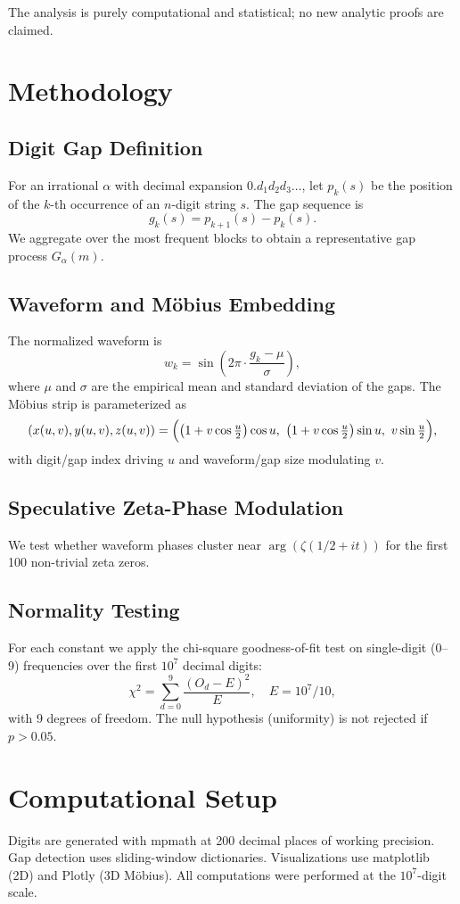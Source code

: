 \documentclass[11pt]{amsart}
\theoremstyle{plain}
\theoremstyle{definition}
\begin{document}
The analysis is purely computational and statistical; no new analytic proofs are claimed.

\section{Methodology}

\subsection{Digit Gap Definition}
For an irrational $\alpha$ with decimal expansion $0.d_1 d_2 d_3 \dots$, let $p_k(s)$ be the position of the $k$-th occurrence of an $n$-digit string $s$. The gap sequence is
\[
g_k(s) = p_{k+1}(s) - p_k(s).
\]
We aggregate over the most frequent blocks to obtain a representative gap process $G_\alpha(m)$.

\subsection{Waveform and Möbius Embedding}
The normalized waveform is
\[
w_k = \sin\left(2\pi \cdot \frac{g_k - \mu}{\sigma}\right),
\]
where $\mu$ and $\sigma$ are the empirical mean and standard deviation of the gaps. The Möbius strip is parameterized as
\[
(x(u,v), y(u,v), z(u,v)) = \Bigl( \bigl(1 + v \cos\tfrac{u}{2}\bigr)\cos u,\ 
\bigl(1 + v \cos\tfrac{u}{2}\bigr)\sin u,\ v \sin\tfrac{u}{2} \Bigr),
\]
with digit/gap index driving $u$ and waveform/gap size modulating $v$.

\subsection{Speculative Zeta-Phase Modulation}
We test whether waveform phases cluster near $\arg(\zeta(1/2 + it))$ for the first 100 non-trivial zeta zeros.

\subsection{Normality Testing}
For each constant we apply the chi-square goodness-of-fit test on single-digit (0--9) frequencies over the first $10^7$ decimal digits:
\[
\chi^2 = \sum_{d=0}^{9} \frac{(O_d - E)^2}{E}, \quad E = 10^7 / 10,
\]
with 9 degrees of freedom. The null hypothesis (uniformity) is not rejected if $p > 0.05$.

\section{Computational Setup}
Digits are generated with mpmath at 200 decimal places of working precision. Gap detection uses sliding-window dictionaries. Visualizations use matplotlib (2D) and Plotly (3D Möbius). All computations were performed at the $10^7$-digit scale.
\end{document}
